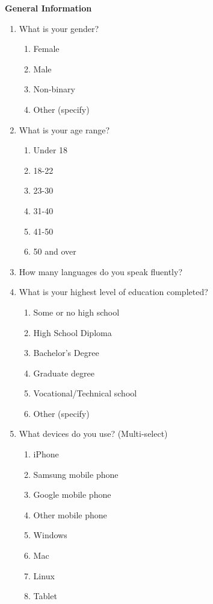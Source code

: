 \documentclass[acmsmall,screen,authorversion,nonacm]{acmart}
\begin{document}
\textbf{General Information}
\begin{enumerate}
    \item What is your gender?
        \begin{enumerate}
            \item Female
            \item Male
            \item Non-binary
            \item Other (specify)
        \end{enumerate}
    \item What is your age range?
        \begin{enumerate}
            \item Under 18
            \item 18-22
            \item 23-30
            \item 31-40
            \item 41-50
            \item 50 and over
        \end{enumerate}
    \item How many languages do you speak fluently?
    \item What is your highest level of education completed?
        \begin{enumerate}
            \item Some or no high school
            \item High School Diploma
            \item Bachelor's Degree
            \item Graduate degree
            \item Vocational/Technical school
            \item Other (specify)
        \end{enumerate}
    \item What devices do you use? (Multi-select)
        \begin{enumerate}
            \item iPhone
            \item Samsung mobile phone
            \item Google mobile phone
            \item Other mobile phone
            \item Windows
            \item Mac
            \item Linux
            \item Tablet

\end{enumerate}
\end{enumerate}
\end{document}
